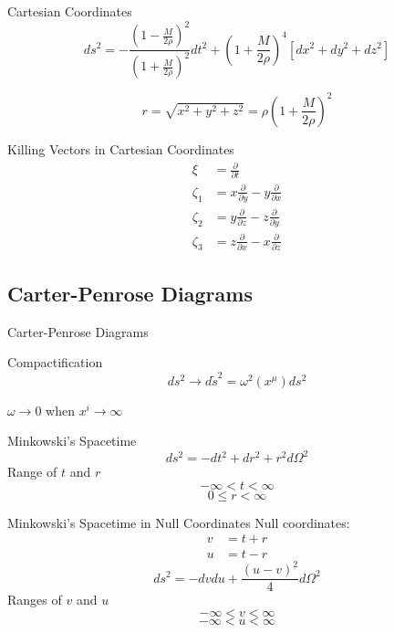 \documentclass{beamer}
\begin{document}
        \begin{frame}{Cartesian Coordinates}
        	$$ ds^2 = -\frac{\left(1-\frac{M}{2\rho}\right)^2}
            {\left(1+\frac{M}{2\rho}\right)^{2}} dt^2 + \left(1+\frac{M}{2\rho}\right)^4 
            \left[dx^2 + dy^2 + dz^2\right]$$
            
            $$r = \sqrt{x^{2}+y^{2}+z^{2}} = \rho\left(1+\frac{M}{2\rho}\right)^2$$
    	\end{frame}
        
        \begin{frame}{Killing Vectors in Cartesian Coordinates}
        	\pause
        	\begin{align*}
				\xi &= \frac{\partial}{\partial t}\\
				\zeta_1 &= x\frac{\partial}{\partial y}-y\frac{\partial}{\partial x}\\
				\zeta_2 &= y\frac{\partial}{\partial z}-z\frac{\partial}{\partial y}\\
				\zeta_3 &= z\frac{\partial}{\partial x}-x\frac{\partial}{\partial z}
			\end{align*}
       	\end{frame}


  	\subsection{Carter-Penrose Diagrams}
    
    	\begin{frame}
        	\Large
			{Carter-Penrose Diagrams}
		\end{frame}
        
  		\begin{frame}{Compactification}
  			$$ ds^2\longrightarrow d\tilde{s}^2 = \omega^2 \left( x^\mu \right) ds^2$$
            \pause
            \bigskip
            
            \centering
            {$\omega \longrightarrow 0$ when $x^i\longrightarrow\infty$}
  		\end{frame}
        
    	\begin{frame}{Minkowski's Spacetime}
			$$ ds^2 = -dt^2 + dr^2+r^2 d\Omega^2 $$
			\pause
			Range of $t$ and $r$ 
				$$ -\infty <   t  <\infty$$
             	$$0\leq r <\infty$$
    	\end{frame}
        
    	\begin{frame}{Minkowski's Spacetime in Null Coordinates}
    		Null coordinates:
			\begin{align*}
				v &=  t+r\\
				u &=  t-r
			\end{align*}
			\pause
			$$ ds^2= - dvdu + \frac{ \left( u-v \right)^2}{4} d\Omega^2 $$
            \pause
			Ranges of $v$ and $u$
            	$$ -\infty <  v < \infty$$
                $$ -\infty <  u < \infty$$
    	\end{frame}
        
\end{document}
